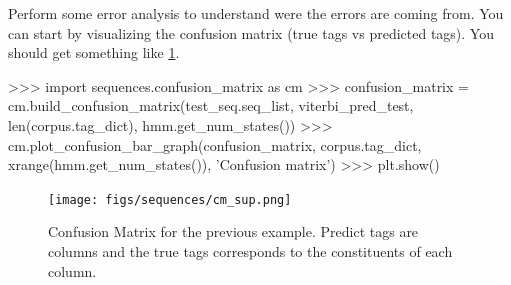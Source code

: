 \begin{exercise}
Perform some error analysis to understand were the errors are coming
from. You can start by visualizing the confusion matrix (true tags vs
predicted tags). You should get something like \ref{fig:cm_uns}.

\begin{python}
>>> import sequences.confusion_matrix as cm
>>> confusion_matrix = cm.build_confusion_matrix(test_seq.seq_list, viterbi_pred_test, len(corpus.tag_dict), hmm.get_num_states())
>>> cm.plot_confusion_bar_graph(confusion_matrix, corpus.tag_dict, xrange(hmm.get_num_states()), 'Confusion matrix')
>>> plt.show()
\end{python}

\begin{figure}
\centering
\texttt{[image: figs/sequences/cm\_sup.png]}
\caption{\label{fig:cm_uns} Confusion Matrix for the previous
  example. Predict tags are columns and the true tags corresponds to
  the constituents of each column.}
\end{figure}

\end{exercise}


%
%



